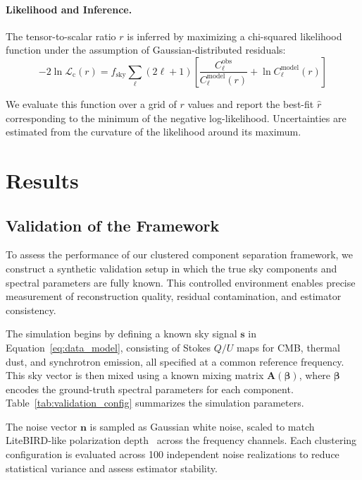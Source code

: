 \documentclass[fleqn,usenatbib]{mnras}
\begin{document}
\paragraph{Likelihood and Inference.}
The tensor-to-scalar ratio \( r \) is inferred by maximizing a chi-squared likelihood function under the assumption of Gaussian-distributed residuals:
\begin{equation}
-2 \ln \mathcal{L}_{\mathrm{c}}(r) = f_{\mathrm{sky}} \sum_\ell (2\ell + 1) \left[ \frac{C_\ell^{\mathrm{obs}}}{C_\ell^{\mathrm{model}}(r)} + \ln C_\ell^{\mathrm{model}}(r) \right]
\end{equation}


We evaluate this function over a grid of \( r \) values and report the best-fit \( \hat{r} \) corresponding to the minimum of the negative log-likelihood. Uncertainties are estimated from the curvature of the likelihood around its maximum.

\section{Results}
\label{sec:results}

\subsection{Validation of the Framework}
\label{subsec:validation}

To assess the performance of our clustered component separation framework, we construct a synthetic validation setup in which the true sky components and spectral parameters are fully known. This controlled environment enables precise measurement of reconstruction quality, residual contamination, and estimator consistency.

The simulation begins by defining a known sky signal \( \mathbf{s} \) in Equation~\eqref{eq:data_model}, consisting of Stokes \( Q/U \) maps for CMB, thermal dust, and synchrotron emission, all specified at a common reference frequency. This sky vector is then mixed using a known mixing matrix \( \mathbf{A}(\boldsymbol{\beta}) \), where \( \boldsymbol{\beta} \) encodes the ground-truth spectral parameters for each component. Table~\ref{tab:validation_config} summarizes the simulation parameters.

The noise vector \( \mathbf{n} \) is sampled as Gaussian white noise, scaled to match LiteBIRD-like polarization depth~\citep{LiteBIRD_PTEP_2022} across the frequency channels. Each clustering configuration is evaluated across 100 independent noise realizations to reduce statistical variance and assess estimator stability.
\end{document}
